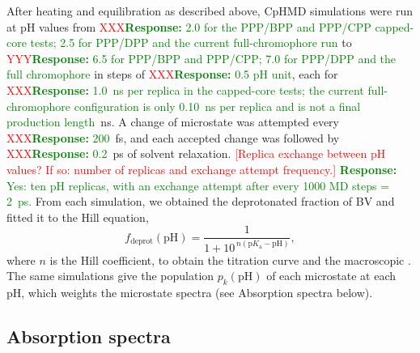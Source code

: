 After heating and equilibration as described above, CpHMD simulations were run at pH values from \textcolor{red}{XXX}\textcolor{green}{\textbf{Response:} 2.0 for the PPP/BPP and PPP/CPP capped-core tests; 2.5 for PPP/DPP and the current full-chromophore run} to \textcolor{red}{YYY}\textcolor{green}{\textbf{Response:} 6.5 for PPP/BPP and PPP/CPP; 7.0 for PPP/DPP and the full chromophore} in steps of \textcolor{red}{XXX}\textcolor{green}{\textbf{Response:} 0.5 pH unit}, each for \textcolor{red}{XXX}\textcolor{green}{\textbf{Response:} 1.0~ns per replica in the capped-core tests; the current full-chromophore configuration is only 0.10~ns per replica and is not a final production length}~ns.
A change of microstate was attempted every \textcolor{red}{XXX}\textcolor{green}{\textbf{Response:} 200}~fs, and each accepted change was followed by \textcolor{red}{XXX}\textcolor{green}{\textbf{Response:} 0.2}~ps of solvent relaxation.
\textcolor{red}{[Replica exchange between pH values? If so: number of replicas and exchange attempt frequency.]}
\textcolor{green}{\textbf{Response:} Yes: ten pH replicas, with an exchange attempt after every 1000 MD steps = 2~ps.}
From each simulation, we obtained the deprotonated fraction of BV and fitted it to the Hill equation,
\begin{equation}
f_{\mathrm{deprot}}(\mathrm{pH})
=
\frac{1}{1+10^{\,n\left(\mathrm{p}K_{\mathrm{a}}-\mathrm{pH}\right)}},
\label{eq:hill}
\end{equation}
where $n$ is the Hill coefficient, to obtain the titration curve and the macroscopic \pka{}.
The same simulations give the population $p_k(\mathrm{pH})$ of each microstate at each pH, which weights the microstate spectra (see Absorption spectra below).

\subsection{Absorption spectra}
\label{sec:spectra}

